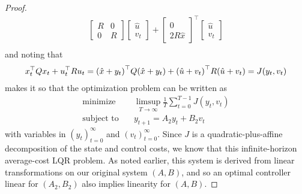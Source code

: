 \documentclass[12pt]{article}
\begin{document}
\begin{proof}
\begin{align*}
          \begin{bmatrix} R & 0 \\ 0 & R \end{bmatrix}
          \begin{bmatrix} \hat{u} \\ v_t \end{bmatrix}
        + \begin{bmatrix} 0 \\ 2 R \hat{x} \end{bmatrix}^\top
          \begin{bmatrix} \hat{u} \\ v_t \end{bmatrix} \\
  \end{align*}
  and noting that
  \begin{align*}
    x_t ^\top Q x_t + u_t ^\top R u_t
      = {\left(\hat{x} + y_t\right)}^\top Q {\left(\hat{x} + y_t\right)}
        + {\left(\hat{u} + v_t\right)}^\top R {\left(\hat{u} + v_t\right)}
      = J(y_t, v_t)
  \end{align*}
  makes it so that the optimization problem can be written as
  \begin{align*}
    \text{minimize}
      &\quad
        \limsup_{T \to \infty} \frac{1}{T} \sum_{t = 0}^{T - 1}
          J(y_t, v_t) \\
    \text{subject to}
      &\quad y_{t + 1} = A_2 y_t + B_2 v_t
  \end{align*}
  with variables in \((y_t)_{t = 0}^{\infty}\) and \((v_t)_{t = 0}^{\infty}\).
  Since \(J\) is a quadratic-plus-affine decomposition of the
  state and control costs,
  we know that this infinite-horizon average-cost LQR problem.
  As noted earlier,
  this system is derived from linear transformations on our original
  system \((A, B)\), and so an optimal controller linear for \((A_2, B_2)\)
  also implies linearity for \((A, B)\).

\end{proof}



\printbibliography
\end{document}

